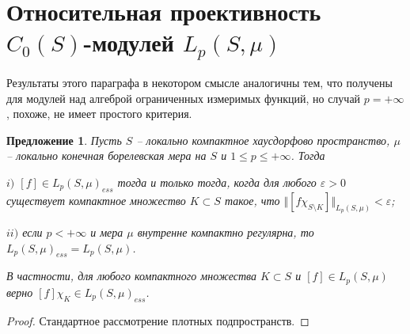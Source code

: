 \documentclass[12pt]{article}
\newtheorem{proposition}[theorem]{Предложение}
\begin{document}

\section{Относительная проективность \texorpdfstring{$C_0(S)$}{C0S}-модулей \texorpdfstring{$L_p(S,\mu)$}{LpSmu}}
\label{SectionRelativeProjectivityOfC0SModulesLpSmu}

Результаты этого параграфа в некотором смысле аналогичны тем, что получены для модулей над алгеброй ограниченных измеримых функций, но случай $p=+\infty$, похоже, не имеет простого критерия.

\begin{proposition}\label{LpEssC0ModCharac} Пусть $S$ -- локально компактное хаусдорфово пространство, $\mu$ -- локально конечная борелевская мера на $S$ и $1\leq p\leq+\infty$. Тогда

    $i)$ $[f]\in L_p(S,\mu)_{ess}$ тогда и только тогда, когда для любого $\varepsilon >0$ существует компактное множество $K\subset S$ такое, что $\Vert [f\chi_{S\setminus K}]\Vert_{L_p(S,\mu)}< \varepsilon$;

    $ii)$ если $p<+\infty$ и мера $\mu$ внутренне компактно регулярна, то $L_p(S,\mu)_{ess}=L_p(S,\mu)$.

    В частности, для любого компактного множества $K\subset S$ и $[f]\in L_p(S,\mu)$ верно $[f]\chi_K\in L_p(S,\mu)_{ess}$.
\end{proposition}
\begin{proof} Стандартное рассмотрение плотных подпространств.
\end{proof}
\end{document}
